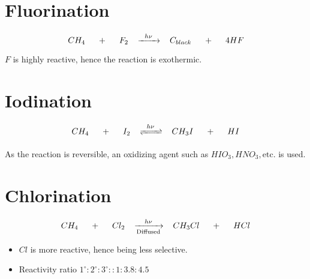 \documentclass{article}
\title{}
\author{}
\date{}
\begin{document}
\maketitle

\section{Fluorination}
$$CH_{4} \hspace{5mm} + \hspace{5mm} F_{2} \hspace{3mm} \xrightarrow{\hspace{2mm} h \nu \hspace{2mm}} \hspace{3mm} C_{black} \hspace{5mm} + \hspace{5mm} 4 HF$$

$F$ is highly reactive, hence the reaction is exothermic.

\section{Iodination}
$$CH_{4}\hspace{5mm}+\hspace{5mm}I_{2}\hspace{3mm}\xrightleftharpoons[]{\hspace{2mm} h \nu \hspace{2mm}}\hspace{3mm} CH_{3}I\hspace{5mm} + \hspace{5mm} HI$$

As the reaction is reversible, an oxidizing agent such as $HIO_{3}, HNO_{3}, \text{etc.}$ is used.

\section{Chlorination}
$$CH_{4} \hspace{5mm} + \hspace{5mm} Cl_{2} \hspace{3mm} \xrightarrow[\text{Diffused}]{\hspace{2mm} h\nu \hspace{2mm}} \hspace{3mm} CH_{3}Cl \hspace{5mm} + \hspace{5mm} HCl$$
\begin{itemize}
\item $Cl$ is more reactive, hence being less selective.
\item Reactivity ratio $1^\circ : 2^\circ : 3^\circ :: 1:3.8:4.5$
\end{itemize}
\end{document}

